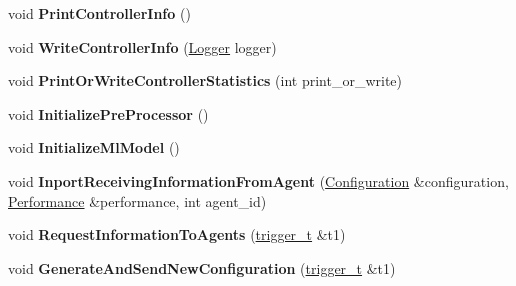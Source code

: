 \begin{DoxyCompactItemize}
void {\bfseries Print\+Controller\+Info} ()
\item 
\mbox{\label{classcompcxx__CentralController__26_a435e72555f967529c864d27f56cad784}} 
void {\bfseries Write\+Controller\+Info} (\hyperlink{structLogger}{Logger} logger)
\item 
\mbox{\label{classcompcxx__CentralController__26_ab4ecf9884160ee09400d6558280e7745}} 
void {\bfseries Print\+Or\+Write\+Controller\+Statistics} (int print\+\_\+or\+\_\+write)
\item 
\mbox{\label{classcompcxx__CentralController__26_ab1f4d23d3e2bacc1e3a8c366a319e5a1}} 
void {\bfseries Initialize\+Pre\+Processor} ()
\item 
\mbox{\label{classcompcxx__CentralController__26_a5898f87c98328150b3068339fad1a60f}} 
void {\bfseries Initialize\+Ml\+Model} ()
\item 
\mbox{\label{classcompcxx__CentralController__26_a16c6d188ca224758ad784079c74ae7b8}} 
void {\bfseries Inport\+Receiving\+Information\+From\+Agent} (\hyperlink{structConfiguration}{Configuration} \&configuration, \hyperlink{structPerformance}{Performance} \&performance, int agent\+\_\+id)
\item 
\mbox{\label{classcompcxx__CentralController__26_ab8a6dc5fa163095aa0c734bf8164e142}} 
void {\bfseries Request\+Information\+To\+Agents} (\hyperlink{classtrigger__t}{trigger\+\_\+t} \&t1)
\item 
\mbox{\label{classcompcxx__CentralController__26_adbb033d225b0b25007e170216ffc322d}} 
void {\bfseries Generate\+And\+Send\+New\+Configuration} (\hyperlink{classtrigger__t}{trigger\+\_\+t} \&t1)
\end{DoxyCompactItemize}

